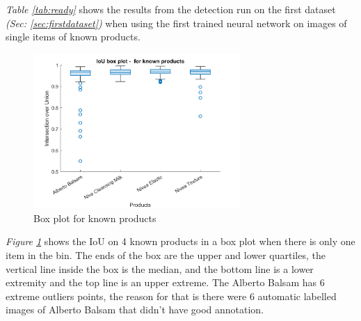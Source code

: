 \begin{table}[h]
\caption{Detection results when tested on trained data using the first neural network}
\label{tab:ready}
\end{table}
\textit{Table \ref{tab:ready}} shows the results from the detection run on the first dataset \textit{(Sec: \ref{sec:firstdataset})} when using the first trained neural network on images of single items of known products.

\begin{figure}[h]
    \centering
    \includegraphics[width=0.7\textwidth]{graphics/results/boxplotForKnownProducts.png}
    \caption{Box plot for known products}
    \label{fig:boxknownproducts}
\end{figure}
\textit{Figure \ref{fig:boxknownproducts}} shows the IoU on 4 known products in a box plot when there is only one item in the bin. The ends of the box are the upper and lower quartiles,  the vertical line inside the box is the median, and the bottom line is a lower extremity and the top line is an upper extreme. The Alberto Balsam has 6 extreme outliers points, the reason for that is there were 6 automatic labelled images of Alberto Balsam that didn’t have good annotation. 


